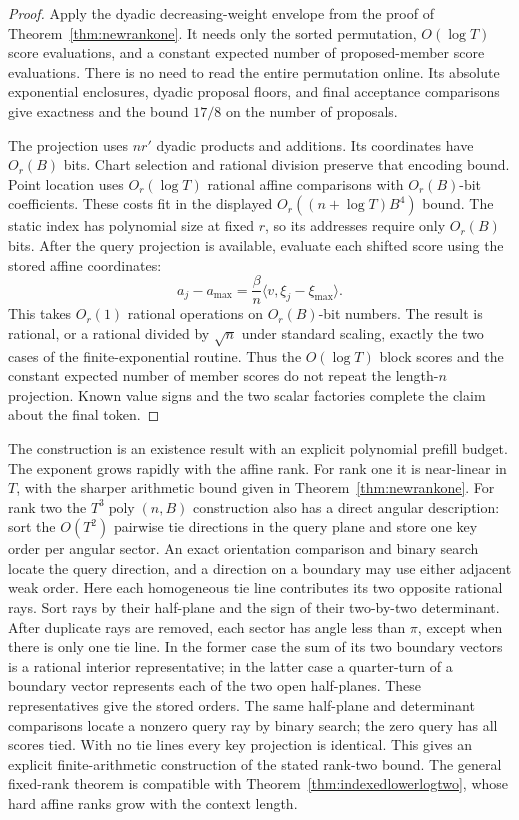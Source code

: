 \begin{proof}
Apply the dyadic decreasing-weight envelope from the proof of
Theorem~\ref{thm:newrankone}.  It needs only the sorted permutation,
$O(\log T)$ score evaluations, and a constant expected number of
proposed-member score evaluations.  There is no need to read the
entire permutation online.  Its absolute exponential enclosures,
dyadic proposal floors, and final acceptance comparisons give
exactness and the bound $17/8$ on the number of proposals.

The projection uses $nr'$ dyadic products and additions.  Its
coordinates have $O_r(B)$ bits.  Chart selection and rational
division preserve that encoding bound.  Point location uses
$O_r(\log T)$ rational affine comparisons with
$O_r(B)$-bit coefficients.  These costs fit in the displayed
$O_r((n+\log T)B^4)$ bound.  The static index has polynomial size
at fixed $r$, so its addresses require only $O_r(B)$ bits.
After the query projection is available, evaluate each shifted score
using the stored affine coordinates:
\[
 a_j-a_{\max}=\frac\beta n
          \langle v,\xi_j-\xi_{\max}\rangle.
\]
This takes $O_r(1)$ rational operations on $O_r(B)$-bit numbers.
The result is rational, or a rational divided by $\sqrt n$ under
standard scaling, exactly the two cases of the finite-exponential
routine.  Thus the $O(\log T)$ block scores and the constant expected
number of member scores do not repeat the length-$n$ projection.
Known value signs and
the two scalar factories complete the claim about the final token.
\end{proof}

The construction is an existence result with an explicit polynomial
prefill budget.  The exponent grows rapidly with the affine rank.
For rank one it is near-linear in $T$, with the sharper arithmetic
bound given in Theorem~\ref{thm:newrankone}.  For rank two the
$T^3\operatorname{poly}(n,B)$ construction also has a direct angular
description: sort the $O(T^2)$ pairwise tie directions in the query
plane and store one key order per angular sector.  An exact orientation
comparison and binary search locate the query direction, and a
direction on a boundary may use either adjacent weak order.
Here each homogeneous tie line contributes its two opposite
rational rays.  Sort rays by their half-plane and the sign of their
two-by-two determinant.  After duplicate rays are removed, each
sector has angle less than $\pi$, except when there is only one
tie line.  In the former case the sum of its two boundary vectors
is a rational interior representative; in the latter case a
quarter-turn of a boundary vector represents each of the two open
half-planes.  These representatives give the stored orders.
The same half-plane and determinant comparisons locate a nonzero
query ray by binary search; the zero query has all scores tied.
With no tie lines every key projection is identical.  This gives
an explicit finite-arithmetic construction of the stated rank-two
bound.
The general fixed-rank theorem is compatible with
Theorem~\ref{thm:indexedlowerlogtwo}, whose hard affine ranks grow
with the context length.
